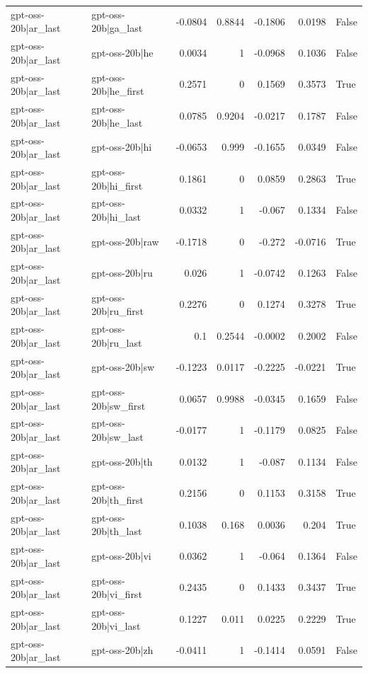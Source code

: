 \begin{table}
\begin{tabular}{l l r r r r l}
gpt-oss-20b|ar_last & gpt-oss-20b|ga_last & -0.0804 & 0.8844 & -0.1806 & 0.0198 & False \\
gpt-oss-20b|ar_last & gpt-oss-20b|he & 0.0034 & 1 & -0.0968 & 0.1036 & False \\
gpt-oss-20b|ar_last & gpt-oss-20b|he_first & 0.2571 & 0 & 0.1569 & 0.3573 & True \\
gpt-oss-20b|ar_last & gpt-oss-20b|he_last & 0.0785 & 0.9204 & -0.0217 & 0.1787 & False \\
gpt-oss-20b|ar_last & gpt-oss-20b|hi & -0.0653 & 0.999 & -0.1655 & 0.0349 & False \\
gpt-oss-20b|ar_last & gpt-oss-20b|hi_first & 0.1861 & 0 & 0.0859 & 0.2863 & True \\
gpt-oss-20b|ar_last & gpt-oss-20b|hi_last & 0.0332 & 1 & -0.067 & 0.1334 & False \\
gpt-oss-20b|ar_last & gpt-oss-20b|raw & -0.1718 & 0 & -0.272 & -0.0716 & True \\
gpt-oss-20b|ar_last & gpt-oss-20b|ru & 0.026 & 1 & -0.0742 & 0.1263 & False \\
gpt-oss-20b|ar_last & gpt-oss-20b|ru_first & 0.2276 & 0 & 0.1274 & 0.3278 & True \\
gpt-oss-20b|ar_last & gpt-oss-20b|ru_last & 0.1 & 0.2544 & -0.0002 & 0.2002 & False \\
gpt-oss-20b|ar_last & gpt-oss-20b|sw & -0.1223 & 0.0117 & -0.2225 & -0.0221 & True \\
gpt-oss-20b|ar_last & gpt-oss-20b|sw_first & 0.0657 & 0.9988 & -0.0345 & 0.1659 & False \\
gpt-oss-20b|ar_last & gpt-oss-20b|sw_last & -0.0177 & 1 & -0.1179 & 0.0825 & False \\
gpt-oss-20b|ar_last & gpt-oss-20b|th & 0.0132 & 1 & -0.087 & 0.1134 & False \\
gpt-oss-20b|ar_last & gpt-oss-20b|th_first & 0.2156 & 0 & 0.1153 & 0.3158 & True \\
gpt-oss-20b|ar_last & gpt-oss-20b|th_last & 0.1038 & 0.168 & 0.0036 & 0.204 & True \\
gpt-oss-20b|ar_last & gpt-oss-20b|vi & 0.0362 & 1 & -0.064 & 0.1364 & False \\
gpt-oss-20b|ar_last & gpt-oss-20b|vi_first & 0.2435 & 0 & 0.1433 & 0.3437 & True \\
gpt-oss-20b|ar_last & gpt-oss-20b|vi_last & 0.1227 & 0.011 & 0.0225 & 0.2229 & True \\
gpt-oss-20b|ar_last & gpt-oss-20b|zh & -0.0411 & 1 & -0.1414 & 0.0591 & False \\

\end{tabular}
\end{table}
